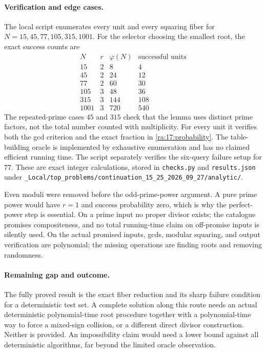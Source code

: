 \documentclass[11pt]{article}
\begin{document}
\paragraph{Verification and edge cases.}
The local script enumerates every unit and every squaring fiber for
$N=15,45,77,105,315,1001$. For the selector choosing the smallest root,
the exact success counts are
\[
\begin{array}{r|r|r|r}
N&r&\varphi(N)&\text{successful units}\\\hline
15&2&8&4\\45&2&24&12\\77&2&60&30\\
105&3&48&36\\315&3&144&108\\1001&3&720&540
\end{array}
\]
The repeated-prime cases $45$ and $315$ check that the lemma uses distinct
prime factors, not the total number counted with multiplicity. For every
unit it verifies both the gcd criterion and the exact fraction in
\eqref{ra:17:probability}. The table-building oracle is implemented by
exhaustive enumeration and has no claimed efficient running time.
The script separately verifies the six-query failure setup for $77$.
These are exact integer calculations, stored in \texttt{checks.py} and
\texttt{results.json} under
\texttt{\_Local/top\_problems/continuation\_15\_25\_2026\_09\_27/analytic/}.

Even moduli were removed before the odd-prime-power argument. A pure
prime power would have $r=1$ and success probability zero, which is why
the perfect-power step is essential. On a prime input no proper divisor
exists; the catalogue promises compositeness, and no total running-time
claim on off-promise inputs is silently used. On the actual promised
inputs, gcds, modular squaring, and output verification are polynomial;
the missing operations are finding roots and removing randomness.

\paragraph{Remaining gap and outcome.}
The fully proved result is the exact fiber reduction and its sharp
failure condition for a deterministic test set. A complete solution
along this route needs an actual deterministic polynomial-time root
procedure together with a polynomial-time way to force a mixed-sign
collision, or a different direct divisor construction. Neither is
provided. An impossibility claim would need a lower bound against all
deterministic algorithms, far beyond the limited oracle observation.
\end{document}

